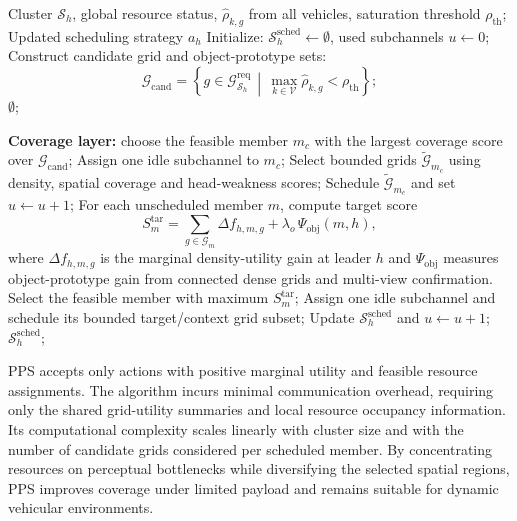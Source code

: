 \documentclass[conference]{IEEEtran}
\begin{document}
\begin{algorithm}[ht]
\caption{Perception-Priority Scheduling (PPS): Approximate Best Response for Leader $h$}
\label{alg:best_response}
\begin{algorithmic}[1]
\REQUIRE Cluster $\mathcal{S}_h$, global resource status, $\hat{\rho}_{k,g}$ from all vehicles, saturation threshold $\rho_{\mathrm{th}}$;
\ENSURE Updated scheduling strategy $a_h$
\STATE Initialize: $\mathcal{S}_h^{\mathrm{sched}} \gets \emptyset$, used subchannels $u \gets 0$;
\STATE Construct candidate grid and object-prototype sets:
\[
\mathcal{G}_{\mathrm{cand}} = \left\{ g \in \mathcal{G}_{\mathcal{S}_h}^{\mathrm{req}} \,\middle|\, \max_{k \in \mathcal{V}} \hat{\rho}_{k,g} < \rho_{\mathrm{th}} \right\};
\]
    \RETURN $\emptyset$;
\ENDIF

\STATE \textbf{Coverage layer:} choose the feasible member $m_c$ with the largest coverage score over $\mathcal{G}_{\mathrm{cand}}$;
    \STATE Assign one idle subchannel to $m_c$;
    \STATE Select bounded grids $\tilde{\mathcal{G}}_{m_c}$ using density, spatial coverage and head-weakness scores;
    \STATE Schedule $\tilde{\mathcal{G}}_{m_c}$ and set $u \gets u+1$;
\ENDIF
{}
    \STATE For each unscheduled member $m$, compute target score
    \[
    S_m^{\mathrm{tar}} = \sum_{g \in \mathcal{G}_m} \Delta f_{h,m,g}
    + \lambda_o \, \Psi_{\mathrm{obj}}(m,h),
    \]
    where $\Delta f_{h,m,g}$ is the marginal density-utility gain at leader $h$ and $\Psi_{\mathrm{obj}}$ measures object-prototype gain from connected dense grids and multi-view confirmation.
    \STATE Select the feasible member with maximum $S_m^{\mathrm{tar}}$;
    \STATE Assign one idle subchannel and schedule its bounded target/context grid subset;
    \STATE Update $\mathcal{S}_h^{\mathrm{sched}}$ and $u \gets u + 1$;
\ENDWHILE
\RETURN $\mathcal{S}_h^{\mathrm{sched}}$;
\end{algorithmic}
\end{algorithm}

PPS accepts only actions with positive marginal utility and feasible resource assignments. The algorithm incurs minimal communication overhead, requiring only the shared grid-utility summaries and local resource occupancy information. Its computational complexity scales linearly with cluster size and with the number of candidate grids considered per scheduled member. By concentrating resources on perceptual bottlenecks while diversifying the selected spatial regions, PPS improves coverage under limited payload and remains suitable for dynamic vehicular environments.
\end{document}
